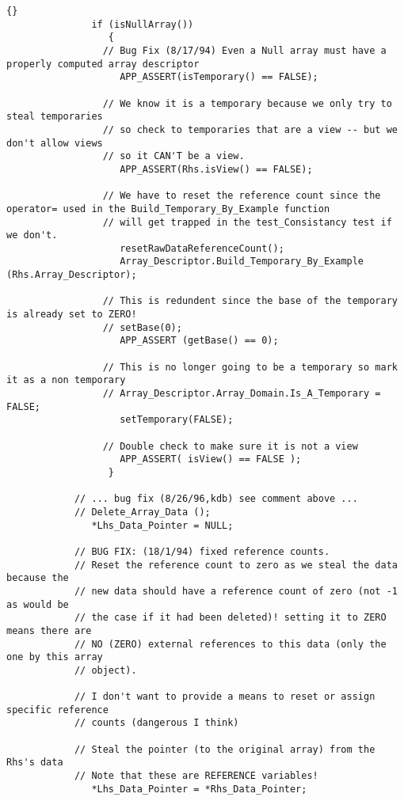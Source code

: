 \documentclass[10pt]{llncs}
\begin{document}
\begin{lstlisting}{}
               if (isNullArray())
                  {
                 // Bug Fix (8/17/94) Even a Null array must have a properly computed array descriptor
                    APP_ASSERT(isTemporary() == FALSE);

                 // We know it is a temporary because we only try to steal temporaries
                 // so check to temporaries that are a view -- but we don't allow views
                 // so it CAN'T be a view.
                    APP_ASSERT(Rhs.isView() == FALSE);

                 // We have to reset the reference count since the operator= used in the Build_Temporary_By_Example function
                 // will get trapped in the test_Consistancy test if we don't.
                    resetRawDataReferenceCount();
                    Array_Descriptor.Build_Temporary_By_Example (Rhs.Array_Descriptor);

                 // This is redundent since the base of the temporary is already set to ZERO!
                 // setBase(0);
                    APP_ASSERT (getBase() == 0);

                 // This is no longer going to be a temporary so mark it as a non temporary
                 // Array_Descriptor.Array_Domain.Is_A_Temporary = FALSE;
                    setTemporary(FALSE);

                 // Double check to make sure it is not a view
                    APP_ASSERT( isView() == FALSE );
                  }

            // ... bug fix (8/26/96,kdb) see comment above ...
            // Delete_Array_Data ();
               *Lhs_Data_Pointer = NULL;

            // BUG FIX: (18/1/94) fixed reference counts.
            // Reset the reference count to zero as we steal the data because the 
            // new data should have a reference count of zero (not -1 as would be 
            // the case if it had been deleted)! setting it to ZERO means there are
            // NO (ZERO) external references to this data (only the one by this array 
            // object).

            // I don't want to provide a means to reset or assign specific reference 
            // counts (dangerous I think)

            // Steal the pointer (to the original array) from the Rhs's data
            // Note that these are REFERENCE variables!
               *Lhs_Data_Pointer = *Rhs_Data_Pointer;


\end{lstlisting}
\end{document}
